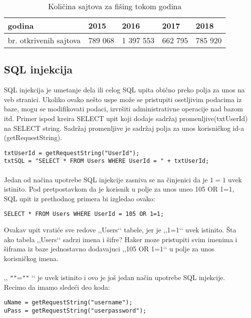 \documentclass[a4paper]{article}
\begin{document}
{\begin{table}[h!]
\begin{center}
\caption{Količina sajtova za fišing tokom godina}
\begin{tabular}{|l||l|l|l|l|} \hline
godina                  & 2015 & 2016 & 2017 & 2018\\ \hline
br. otkrivenih sajtova  & 789 068 & 1 397 553& 662 795& 785 920\\ \hline
\end{tabular}
\label{tab:tabela1}
\end{center}
\end{table}



\subsection{SQL injekcija}
\label{subsec:sql}

SQL injekcija je umetanje dela ili celog SQL upita obično preko polja za unos na veb stranici. Ukoliko ovako nešto uspe može se pristupiti osetljivim podacima iz baze, mogu se modifikovati podaci, izvršiti administrativne operacije nad bazom itd. Primer ispod kreira SELECT upit koji dodaje sadržaj promenljive(txtUserId) na SELECT string. Sadržaj promenljive je sadržaj polja za unos korisničkog id-a (getRequestString).
\begin{verbatim}
txtUserId = getRequestString("UserId");
txtSQL = "SELECT * FROM Users WHERE UserId = " + txtUserId;
\end{verbatim}

\paragraph{}
Jedan od načina upotrebe SQL injekcije zasniva se na činjenici da je $1=1$ uvek istinito. Pod pretpostavkom da je korisnik u polje za unos uneo 105 OR 1=1, SQL upit iz prethodnog primera bi izgledao ovako:

\begin{verbatim}
SELECT * FROM Users WHERE UserId = 105 OR 1=1;
\end{verbatim}


\noindent Ovakav upit vratiće sve redove ,,Users‘‘ tabele, jer je ,,1=1‘‘ uvek istinito. Šta ako tabela ,,Users‘‘ sadrzi imena i šifre? Haker moze pristupiti svim imenima i šiframa iz baze jednostavno dodavajuci ,,105 OR 1=1‘‘ u polje za unos korisničkog imena.

\paragraph{}
 ,, \texttt{"}\texttt{"}=\texttt{"}\texttt{"} ‘‘ je uvek istinito i ovo je još jedan način upotrebe SQL injekcije. Recimo da imamo sledeći deo koda:
\begin{verbatim}
uName = getRequestString("username");
uPass = getRequestString("userpassword");


\end{verbatim}}
\end{document}

